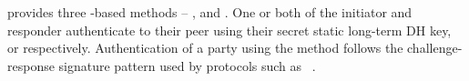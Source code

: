 %    
\mEdhoc{} provides three \mStat-based methods -- \mSigStat{}, \mStatStat{} and
\mStatSig{}.
%
One or both of the initiator and responder authenticate to their peer using
their secret static long-term DH key, \mLtki{} or \mLtkr{} respectively.
%
Authentication of a party using the \mStat{} method follows the
challenge-response signature pattern used by protocols such as
\mOptls~\cite{DBLP:conf/eurosp/KrawczykW16}.
%
